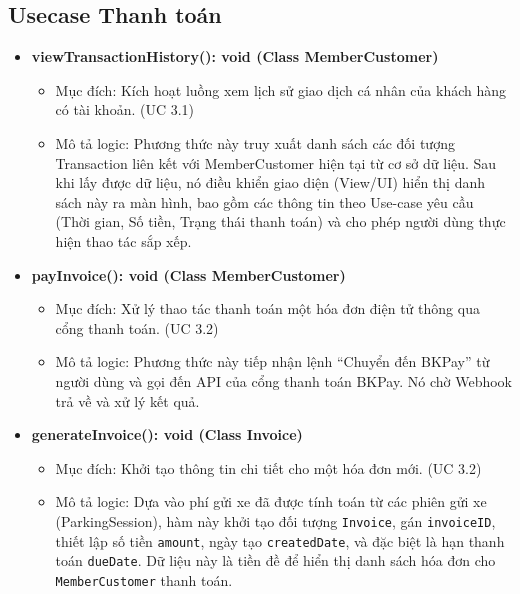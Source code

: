 \subsection{Usecase Thanh toán}

\begin{itemize}

    \item \textbf{viewTransactionHistory(): void (Class MemberCustomer)}
    \begin{itemize}
        \item Mục đích: Kích hoạt luồng xem lịch sử giao dịch cá nhân của khách hàng có tài khoản. (UC 3.1)

        \item Mô tả logic: Phương thức này truy xuất danh sách các đối tượng Transaction liên kết với MemberCustomer hiện tại từ cơ sở dữ liệu. Sau khi lấy được dữ liệu, nó điều khiển giao diện (View/UI) hiển thị danh sách này ra màn hình, bao gồm các thông tin theo Use-case yêu cầu (Thời gian, Số tiền, Trạng thái thanh toán) và cho phép người dùng thực hiện thao tác sắp xếp.
    \end{itemize}

    \item \textbf{payInvoice(): void (Class MemberCustomer)}
    \begin{itemize}     
        \item Mục đích: Xử lý thao tác thanh toán một hóa đơn điện tử thông qua cổng thanh toán. (UC 3.2)

        \item Mô tả logic: Phương thức này tiếp nhận lệnh ``Chuyển đến BKPay'' từ người dùng và gọi đến API của cổng thanh toán BKPay. Nó chờ Webhook trả về và xử lý kết quả.      
    \end{itemize}

    \item \textbf{generateInvoice(): void (Class Invoice)}
    \begin{itemize}
        \item Mục đích: Khởi tạo thông tin chi tiết cho một hóa đơn mới. (UC 3.2)

        \item Mô tả logic: Dựa vào phí gửi xe đã được tính toán từ các phiên gửi xe (ParkingSession), hàm này khởi tạo đối tượng \texttt{Invoice}, gán \texttt{invoiceID}, thiết lập số tiền \texttt{amount}, ngày tạo \texttt{createdDate}, và đặc biệt là hạn thanh toán \texttt{dueDate}. Dữ liệu này là tiền đề để hiển thị danh sách hóa đơn cho \texttt{MemberCustomer} thanh toán.
    \end{itemize}


\end{itemize}
